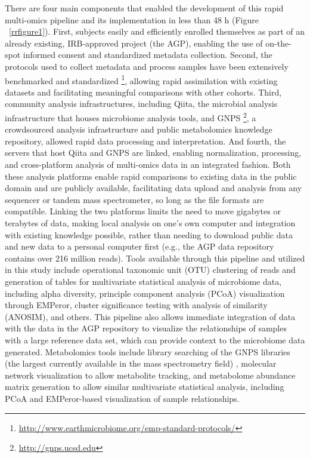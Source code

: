 There are four main components that enabled the development of this rapid multi-omics
pipeline and its implementation in less than 48 h (Figure ~\ref{rrfigure1}). First,
subjects easily and efficiently enrolled themselves as part of an already existing,
IRB-approved project (the AGP), enabling the use of on-the-spot informed consent and
standardized metadata collection. Second, the protocols used to collect metadata and
process samples have been extensively benchmarked and
standardized \footnote{\url{http://www.earthmicrobiome.org/emp-standard-protocols/}},
allowing rapid assimilation with existing datasets and facilitating meaningful
comparisons with other cohorts. Third, community analysis infrastructures, including
Qiita, the microbial analysis infrastructure that houses microbiome analysis tools,
and GNPS \footnote{\url{http://gnps.ucsd.edu}}, a crowdsourced analysis infrastructure
and public metabolomics knowledge repository, allowed rapid data processing and
interpretation. And fourth, the servers that host Qiita and GNPS are linked,
enabling normalization, processing, and cross-platform analysis of multi-omics data
in an integrated fashion. Both these analysis platforms enable rapid comparisons to
existing data in the public domain and are publicly available, facilitating data
upload and analysis from any sequencer or tandem mass spectrometer, so long as the
file formats are compatible. Linking the two platforms limits the need to move
gigabytes or terabytes of data, making local analysis on one’s own computer and
integration with existing knowledge possible, rather than needing to download public
data and new data to a personal computer first (e.g., the AGP data repository
contains over 216 million reads). Tools available through this pipeline and utilized
in this study include operational taxonomic unit (OTU) clustering of reads and
generation of tables for multivariate statistical analysis of microbiome data,
including alpha diversity, principle component analysis (PCoA) visualization through
EMPeror, cluster significance testing with analysis of similarity (ANOSIM), and others.
This pipeline also allows immediate integration of data with the data in the AGP repository
to visualize the relationships of samples with a large reference data set, which can
provide context to the microbiome data generated. Metabolomics tools include library
searching of the GNPS libraries (the largest currently available in the mass
spectrometry field) \cite{Vinaixa2016}, molecular network visualization to allow
metabolite tracking, and metabolome abundance matrix generation to allow similar
multivariate statistical analysis, including PCoA and EMPeror-based visualization
of sample relationships.

